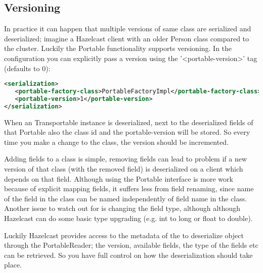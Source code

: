 \subsection*{Versioning}
In practice it can happen that multiple versions of same class are serialized and deserialized; imagine a Hazelcast client with an older Person class compared to the cluster. Luckily the Portable functionality supports versioning. In the configuration you can explicitly pass a version using the '<portable-version>' tag (defaults to 0):
\begin{lstlisting}[language=xml]
<serialization>
   <portable-factory-class>PortableFactoryImpl</portable-factory-class>
   <portable-version>1</portable-version>
</serialization>
\end{lstlisting}
When an Transportable instance is deserialized, next to the deserialized fields of that Portable also the class id and the portable-version will be stored. So every time you make a change to the class, the version should be incremented. 

Adding fields to a class is simple, removing fields can lead to problem if a new version of that class (with the removed field) is deserialized on a client which depends on that field. Although using the Portable interface is more work because of explicit mapping fields, it suffers less from field renaming, since name of the field in the class can be named independently of field name in the class. Another issue to watch out for is changing the field type, although although Hazelcast can do some basic type upgrading (e.g. int to long or float to double). 

Luckily Hazelcast provides access to the metadata of the to deserialize object through the PortableReader; the  version, available fields, the type of the fields etc can be retrieved. So you have full control on how the deserialization should take place. 

